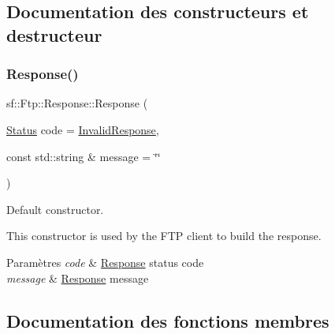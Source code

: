 \subsection{Documentation des constructeurs et destructeur}
\mbox{\label{classsf_1_1Ftp_1_1Response_af300fffd4862774102f978eb22f85d9b}} 
\subsubsection{\texorpdfstring{Response()}{Response()}}
{\footnotesize\ttfamily sf\+::\+Ftp\+::\+Response\+::\+Response (\begin{DoxyParamCaption}\item[{\hyperlink{classsf_1_1Ftp_1_1Response_af81738f06b6f571761696291276acb3b}{Status}}]{code = {\ttfamily \hyperlink{classsf_1_1Ftp_1_1Response_af81738f06b6f571761696291276acb3ba59e041e4ef186e8ae8d6035973fc46bd}{Invalid\+Response}},  }\item[{const std\+::string \&}]{message = {\ttfamily \char`\"{}\char`\"{}} }\end{DoxyParamCaption})\hspace{0.3cm}{\ttfamily [explicit]}}



Default constructor. 

This constructor is used by the F\+TP client to build the response.


\begin{DoxyParams}{Paramètres}
{\em code} & \hyperlink{classsf_1_1Ftp_1_1Response}{Response} status code \\
\hline
{\em message} & \hyperlink{classsf_1_1Ftp_1_1Response}{Response} message \\
\hline
\end{DoxyParams}


\subsection{Documentation des fonctions membres}
\mbox{\label{classsf_1_1Ftp_1_1Response_a4af82a0b3620c90558390e1f600abc05}} 
